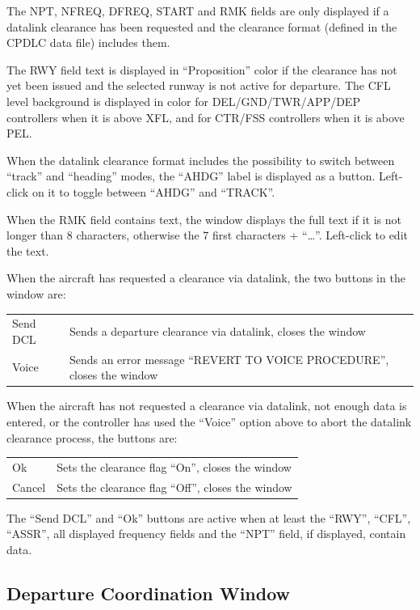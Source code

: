 \documentclass[11pt,a4paper]{memoir}
\newcommand{\colorref}[1]{\textit{\hyperref[#1]{\StrDel{#1}{color:}}}}
\begin{document}
The NPT, NFREQ, DFREQ, START and RMK fields are only displayed if a datalink clearance has been requested and the clearance format (defined in the CPDLC data file) includes them.

The RWY field text is displayed in “Proposition” color if the clearance has not yet been issued and the selected runway is not active for departure. The CFL level background is displayed in \colorref{color:Warning} color for DEL/GND/TWR/APP/DEP controllers when it is above XFL, and for CTR/FSS controllers when it is above PEL.

When the datalink clearance format includes the possibility to switch between “track” and “heading” modes, the “AHDG” label is displayed as a button. Left-click on it to toggle between “AHDG” and “TRACK”.

When the RMK field contains text, the window displays the full text if it is not longer than 8 characters, otherwise the 7 first characters + “…”. Left-click to edit the text.

When the aircraft has requested a clearance via datalink, the two buttons in the window are:

\begin{tabular}{l l}
    Send DCL    & Sends a departure clearance via datalink, closes the window\\
    Voice       & Sends an error message “REVERT TO VOICE PROCEDURE”, closes the window\\
\end{tabular}

When the aircraft has not requested a clearance via datalink, not enough data is entered, or the controller has used the “Voice” option above to abort the datalink clearance process, the buttons are:

\begin{tabular}{l l}
    Ok      & Sets the clearance flag “On”, closes the window\\
    Cancel  & Sets the clearance flag “Off”, closes the window\\
\end{tabular}

The “Send DCL” and “Ok” buttons are active when at least the “RWY”, “CFL”, “ASSR”, all displayed frequency fields and the “NPT” field, if displayed, contain data.

\subsection{Departure Coordination Window}
\label{win:dcw}
\end{document}
